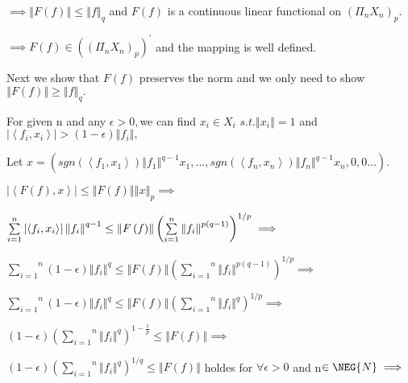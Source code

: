 \documentclass{article}
\begin{document}
$\implies \left\Vert F\left( f\right) \right\Vert \leq \left\Vert
f\right\Vert _{q}$ and $F\left( f\right) $ is a continuous linear functional
on $\left( \Pi _{n}X_{n}\right) _{p}.$

$\implies F\left( f\right) \in \left( \left( \Pi _{n}X_{n}\right)
_{p}\right) ^{\prime }$ and the mapping is well defined.

Next we show that $F\left( f\right) $ preserves the norm and we only need to
show $\left\Vert F\left( f\right) \right\Vert \geq \left\Vert f\right\Vert
_{q}.$

\bigskip For given n and any $\epsilon >0,$we can find $x_{i}\in X_{i}$ $%
s.t.\left\Vert x_{i}\right\Vert =1$ and $\left\vert \left\langle
f_{i},x_{i}\right\rangle \right\vert >\left( 1-\epsilon \right) \left\Vert
f_{i}\right\Vert ,$

Let $x=\left( sgn\left( \left\langle f_{1},x_{1}\right\rangle \right)
\left\Vert f_{1}\right\Vert ^{q-1}x_{1},...,sgn\left( \left\langle
f_{n},x_{n}\right\rangle \right) \left\Vert f_{n}\right\Vert
^{q-1}x_{n},0,0...\right) .$

$\left\vert \left\langle F\left( f\right) ,x\right\rangle \right\vert \leq
\left\Vert F\left( f\right) \right\Vert \left\Vert x\right\Vert _{p}\implies 
$

$\overset{n}{\underset{i=1}{\sum }}\left\vert \left\langle
f_{i},x_{i}\right\rangle \right\vert \left\Vert f_{i}\right\Vert ^{q-1}\leq
\left\Vert F\left( f\right) \right\Vert \left( \overset{n}{\underset{i=1}{%
\sum }}\left\Vert f_{i}\right\Vert ^{p\left( q-1\right) }\right)
^{1/p}\implies $

\bigskip $\overset{n}{\underset{i=1}{\sum }}\left( 1-\epsilon \right)
\left\Vert f_{i}\right\Vert ^{q}\leq \left\Vert F\left( f\right) \right\Vert
\left( \overset{n}{\underset{i=1}{\sum }}\left\Vert f_{i}\right\Vert
^{p\left( q-1\right) }\right) ^{1/p}\implies $

$\overset{n}{\underset{i=1}{\sum }}\left( 1-\epsilon \right) \left\Vert
f_{i}\right\Vert ^{q}\leq \left\Vert F\left( f\right) \right\Vert \left( 
\overset{n}{\underset{i=1}{\sum }}\left\Vert f_{i}\right\Vert ^{q}\right)
^{1/p}\implies $

$\left( 1-\epsilon \right) \left( \overset{n}{\underset{i=1}{\sum }}%
\left\Vert f_{i}\right\Vert ^{q}\right) ^{1-\frac{1}{p}}\leq \left\Vert
F\left( f\right) \right\Vert \implies $

$\left( 1-\epsilon \right) \left( \overset{n}{\underset{i=1}{\sum }}%
\left\Vert f_{i}\right\Vert ^{q}\right) ^{1/q}\leq \left\Vert F\left(
f\right) \right\Vert $ holdes for $\forall \epsilon >0$ and n$\in \NEG%
{N}\implies $
\end{document}

